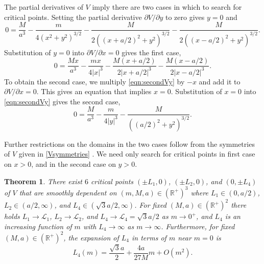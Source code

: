 \documentclass[12pt]{article}
\newtheorem{theorem}{Theorem}
\begin{document}
The partial derivatives of $V$ imply there are two cases in which to search for critical points. Setting the partial derivative $\partial V/\partial y$ to zero gives $y=0$ and
\begin{equation}\label{eqn:secondVy}
0 = \frac{M}{a^3} - \frac{m}{4(x^2+y^2)^{3/2}} - \frac{M}{2((x+a/2)^2 + y^2)^{3/2}} - \frac{M}{2((x-a/2)^2 + y^2)^{3/2}}.
\end{equation}
Substitution of $y=0$ into $\partial V/\partial x = 0$ gives the first case,
\begin{equation}\label{eqn:firstcase}
 0 = \frac{Mx}{a^3} - \frac{mx}{4\vert x\vert^3} - \frac{M(x+a/2)}{2\vert x+a/2\vert^3}-\frac{M(x-a/2)}{2\vert x-a/2\vert^3}.
\end{equation}
To obtain the second case, we multiply \eqref{eqn:secondVy} by $-x$ and add it to $\partial V/\partial x = 0$. This gives an equation that implies $x=0$. Substitution of $x=0$ into \eqref{eqn:secondVy} gives the second case,
\begin{equation}\label{eqn:secondcase}
0 = \frac{M}{a^3} - \frac{m}{4\vert y\vert^3} - \frac{M}{((a/2)^2 + y^2)^{3/2}}.
\end{equation}

Further restrictions on the domains in the two cases follow from the symmetries of $V$ given in \eqref{Vsymmetries} . %
We need only search for critical points in first case on $x>0$, and in the second case on $y>0$.

\begin{theorem}\label{ExistenceCritPts} There exist $6$ critical points $(\pm L_1,0)$, $(\pm L_2,0)$, and $(0,\pm L_4)$ of $V$ that are smoothly dependent on $(m,M,a)\in ({\mathbb R}^+)^3$ where $L_1\in(0,a/2)$, $L_2\in(a/2,\infty)$, and $L_4\in(\sqrt 3 a/2,\infty)$. For fixed $(M,a)\in( {\mathbb R}^+)^2$ there holds $L_1\to {\mathcal L}_1$, $L_2\to {\mathcal L}_2$, and $L_4\to {\mathcal L_4} = \sqrt 3 a /2$ as $m\to 0^+$, and $L_4$ is an increasing function of $m$ with $L_4 \to \infty$ as $m\to\infty$. Furthermore, for fixed $(M,a)\in( {\mathbb R}^+)^2$, the expansion of $L_4$ in terms of $m$ near $m=0$ is
\[ L_4(m) = \frac{ \sqrt 3 a}{2} + \frac{4a}{27 M}m + O(m^2).\]
\end{theorem}
\end{document}
